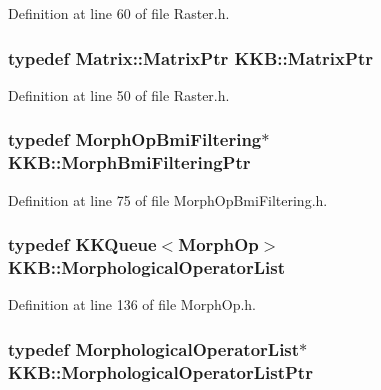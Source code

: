 Definition at line 60 of file Raster.\+h.

\subsubsection[{\texorpdfstring{Matrix\+Ptr}{MatrixPtr}}]{\setlength{\rightskip}{0pt plus 5cm}typedef {\bf Matrix\+::\+Matrix\+Ptr} {\bf K\+K\+B\+::\+Matrix\+Ptr}}\hypertarget{namespace_k_k_b_a6e7c1ba6b19bffb29c885d2a62e7d235}{}\label{namespace_k_k_b_a6e7c1ba6b19bffb29c885d2a62e7d235}


Definition at line 50 of file Raster.\+h.

\subsubsection[{\texorpdfstring{Morph\+Bmi\+Filtering\+Ptr}{MorphBmiFilteringPtr}}]{\setlength{\rightskip}{0pt plus 5cm}typedef {\bf Morph\+Op\+Bmi\+Filtering}$\ast$ {\bf K\+K\+B\+::\+Morph\+Bmi\+Filtering\+Ptr}}\hypertarget{namespace_k_k_b_a7a6cf481828e5a2ee888976a8c008ab8}{}\label{namespace_k_k_b_a7a6cf481828e5a2ee888976a8c008ab8}


Definition at line 75 of file Morph\+Op\+Bmi\+Filtering.\+h.

\subsubsection[{\texorpdfstring{Morphological\+Operator\+List}{MorphologicalOperatorList}}]{\setlength{\rightskip}{0pt plus 5cm}typedef {\bf K\+K\+Queue}$<${\bf Morph\+Op}$>$ {\bf K\+K\+B\+::\+Morphological\+Operator\+List}}\hypertarget{namespace_k_k_b_a998f10e42621678ef0ad2f43b1ddb1ff}{}\label{namespace_k_k_b_a998f10e42621678ef0ad2f43b1ddb1ff}


Definition at line 136 of file Morph\+Op.\+h.

\subsubsection[{\texorpdfstring{Morphological\+Operator\+List\+Ptr}{MorphologicalOperatorListPtr}}]{\setlength{\rightskip}{0pt plus 5cm}typedef {\bf Morphological\+Operator\+List}$\ast$ {\bf K\+K\+B\+::\+Morphological\+Operator\+List\+Ptr}}\hypertarget{namespace_k_k_b_a46af25bc9d36665c235609689cd53d42}{}\label{namespace_k_k_b_a46af25bc9d36665c235609689cd53d42}


